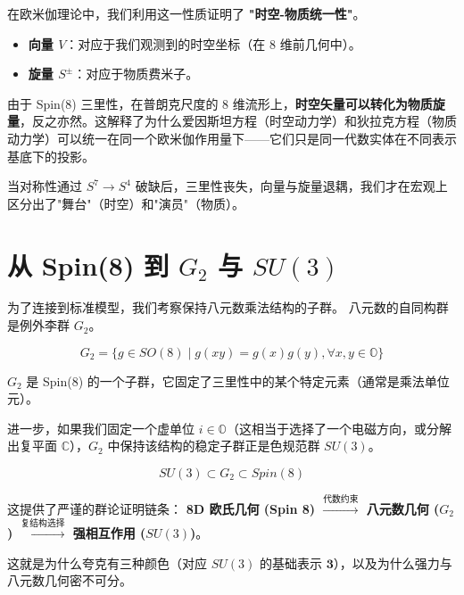 在欧米伽理论中，我们利用这一性质证明了 \textbf{"时空-物质统一性"}。

\begin{itemize}
\item \textbf{向量 $V$}：对应于我们观测到的时空坐标（在 8 维前几何中）。
\item \textbf{旋量 $S^\pm$}：对应于物质费米子。
\end{itemize}

由于 Spin(8) 三里性，在普朗克尺度的 8 维流形上，\textbf{时空矢量可以转化为物质旋量}，反之亦然。这解释了为什么爱因斯坦方程（时空动力学）和狄拉克方程（物质动力学）可以统一在同一个欧米伽作用量下——它们只是同一代数实体在不同表示基底下的投影。

当对称性通过 $S^7 \to S^4$ 破缺后，三里性丧失，向量与旋量退耦，我们才在宏观上区分出了"舞台"（时空）和"演员"（物质）。

\section{从 Spin(8) 到 $G_2$ 与 $SU(3)$}

为了连接到标准模型，我们考察保持八元数乘法结构的子群。
八元数的自同构群是例外李群 \textbf{$G_2$}。

\[G_2 = \{ g \in SO(8) \mid g(xy) = g(x)g(y), \forall x,y \in \mathbb{O} \}\]

$G_2$ 是 Spin(8) 的一个子群，它固定了三里性中的某个特定元素（通常是乘法单位元）。

进一步，如果我们固定一个虚单位 $i \in \mathbb{O}$（这相当于选择了一个电磁方向，或分解出复平面 $\mathbb{C}$），$G_2$ 中保持该结构的稳定子群正是色规范群 \textbf{$SU(3)$}。

\[SU(3) \subset G_2 \subset Spin(8)\]

这提供了严谨的群论证明链条：
\textbf{8D 欧氏几何 (Spin 8) $\xrightarrow{\text{代数约束}}$ 八元数几何 ($G_2$) $\xrightarrow{\text{复结构选择}}$ 强相互作用 ($SU(3)$)}。

这就是为什么夸克有三种颜色（对应 $SU(3)$ 的基础表示 $\mathbf{3}$），以及为什么强力与八元数几何密不可分。
